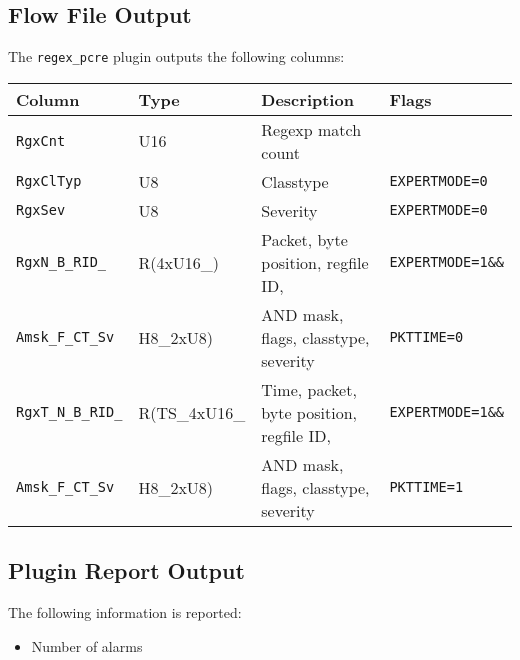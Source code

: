 \documentclass[documentation]{subfiles}
\begin{document}
\subsection{Flow File Output}
The {\tt regex\_pcre} plugin outputs the following columns:
\begin{longtable}{llll}
    \toprule
    {\bf Column} & {\bf Type} & {\bf Description} & {\bf Flags}\\
    \midrule\endhead%
    {\tt RgxCnt} & U16 & Regexp match count \\
    {\tt RgxClTyp} & U8 & Classtype & {\tt EXPERTMODE=0}\\
    {\tt RgxSev} & U8 & Severity & {\tt EXPERTMODE=0}\\
    {\tt RgxN\_B\_RID\_} & R(4xU16\_) & Packet, byte position, regfile ID, & {\tt EXPERTMODE=1\&\&}\\
    {\tt \quad Amsk\_F\_CT\_Sv} & \quad H8\_2xU8) & \quad AND mask, flags, classtype, severity & {\tt PKTTIME=0}\\
    {\tt RgxT\_N\_B\_RID\_} & R(TS\_4xU16\_ & Time, packet, byte position, regfile ID, & {\tt EXPERTMODE=1\&\&}\\
    {\tt \quad Amsk\_F\_CT\_Sv} & \quad H8\_2xU8) & \quad AND mask, flags, classtype, severity & {\tt PKTTIME=1}\\
    \bottomrule
\end{longtable}

\subsection{Plugin Report Output}
The following information is reported:
\begin{itemize}
    \item Number of alarms
\end{itemize}
\end{document}
